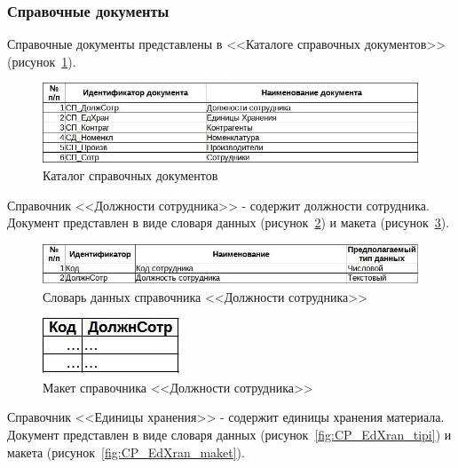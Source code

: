 \documentclass[12pt, a4paper, simple]{eskdtext}
\begin{document}
    \subsubsection{Справочные документы}

    Справочные документы представлены в <<Каталоге справочных документов>> (рисунок~\ref{fig:CP_}).

    \begin{figure}[!h]
        \centering
        \includegraphics[width=14cm]
            {_docs/СП_.jpg}
        \caption{Каталог справочных документов}
        \label{fig:CP_}
    \end{figure}

    Справочник <<Должности сотрудника>> - содержит должности сотрудника.
    Документ представлен в виде словаря данных (рисунок~\ref{fig:CP_DoljnCotr_tipi})
    и макета (рисунок~\ref{fig:CP_DoljnCotr_maket}).

    \begin{figure}[!h]
        \centering
        \includegraphics[width=14cm]
            {_docs/СП_ДолжнСотр_типы.jpg}
        \caption{Словарь данных справочника <<Должности сотрудника>>}
        \label{fig:CP_DoljnCotr_tipi}
    \end{figure}

    \begin{figure}[!h]
        \centering
        \includegraphics[]
            {_docs/СП_ДолжнСотр_макет.jpg}
        \caption{Макет справочника <<Должности сотрудника>>}
        \label{fig:CP_DoljnCotr_maket}
    \end{figure}

    \newpage

    Справочник <<Единицы хранения>> - содержит единицы хранения материала.
    Документ представлен в виде словаря данных (рисунок~\ref{fig:CP_EdXran_tipi})
    и макета (рисунок~\ref{fig:CP_EdXran_maket}).
\end{document}
